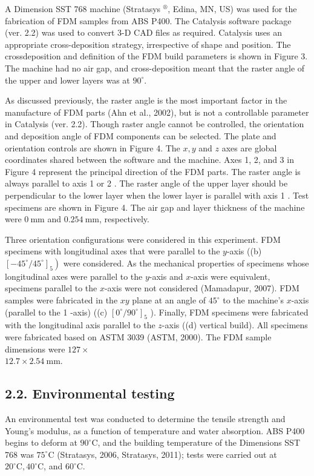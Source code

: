 \documentclass[10pt]{article}
\begin{document}
A Dimension SST 768 machine (Stratasys ${ }^{\circledR}$, Edina, MN, US) was used for the fabrication of FDM samples from ABS P400. The Catalysis software package (ver. 2.2) was used to convert 3-D CAD files as required. Catalysis uses an appropriate cross-deposition strategy, irrespective of shape and position. The crossdeposition and definition of the FDM build parameters is shown in Figure 3. The machine had no air gap, and cross-deposition meant that the raster angle of the upper and lower layers was at $90^{\circ}$.

As discussed previously, the raster angle is the most important factor in the manufacture of FDM parts (Ahn et al., 2002), but is not a controllable parameter in Catalysis (ver. 2.2). Though raster angle cannot be controlled, the orientation and deposition angle of FDM components can be selected. The plate and orientation controls are shown in Figure 4. The $x, y$ and $z$ axes are global coordinates shared between the software and the machine. Axes 1, 2, and 3 in Figure 4 represent the principal direction of the FDM parts. The raster angle is always parallel to axis 1 or 2 . The raster angle of the upper layer should be perpendicular to the lower layer when the lower layer is parallel with axis 1 . Test specimens are shown in Figure 4. The air gap and layer thickness of the machine were $0 \mathrm{~mm}$ and $0.254 \mathrm{~mm}$, respectively.

Three orientation configurations were considered in this experiment. FDM specimens with longitudinal axes that were parallel to the $y$-axis ((b) $\left.\left[-45^{\circ} / 45^{\circ}\right]_{5}\right)$ were considered. As the mechanical properties of specimens whose longitudinal axes were parallel to the $y$-axis and $x$-axis were equivalent, specimens parallel to the $x$-axis were not considered (Mamadapur, 2007). FDM samples were fabricated in the $x y$ plane at an angle of $45^{\circ}$ to the machine's $x$-axis (parallel to the 1 -axis) ((c) $\left[0^{\circ} / 90^{\circ}\right]_{5}$ ). Finally, FDM specimens were fabricated with the longitudinal axis parallel to the $z$-axis ((d) vertical build). All specimens were fabricated based on ASTM 3039 (ASTM, 2000). The FDM sample dimensions were $127 \times$\\
$12.7 \times 2.54 \mathrm{~mm}$.

\subsection*{2.2. Environmental testing}
An environmental test was conducted to determine the tensile strength and Young's modulus, as a function of temperature and water absorption. ABS P400 begins to deform at $90^{\circ} \mathrm{C}$, and the building temperature of the Dimensions SST 768 was $75^{\circ} \mathrm{C}$ (Stratasys, 2006, Stratasys, 2011); tests were carried out at $20^{\circ} \mathrm{C}, 40^{\circ} \mathrm{C}$, and $60^{\circ} \mathrm{C}$.
\end{document}
